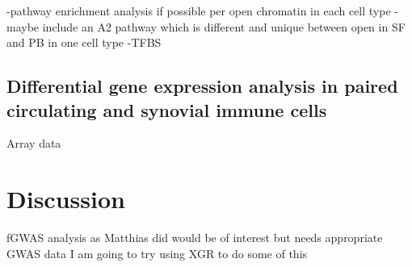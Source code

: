 -pathway enrichment analysis if possible per open chromatin in each cell type
-maybe include an A2 pathway which is different and unique between open in SF and PB in one cell type
-TFBS



\subsection{Differential gene expression analysis in paired circulating and synovial immune cells}
Array data

\section{Discussion}
%


fGWAS analysis as Matthias did would be of interest but needs appropriate GWAS data
I am going to try using XGR to do some of this 



